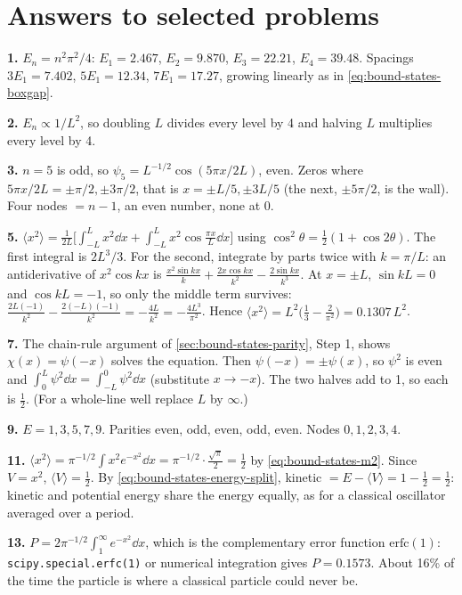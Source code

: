 \section{Answers to selected problems}\label{sec:bound-states-answers}

\textbf{1.} $E_n=n^2\pi^2/4$: $E_1=2.467$, $E_2=9.870$, $E_3=22.21$, $E_4=39.48$. Spacings $3E_1=7.402$, $5E_1=12.34$, $7E_1=17.27$, growing linearly as in \cref{eq:bound-states-boxgap}.

\textbf{2.} $E_n\propto1/L^2$, so doubling $L$ divides every level by 4 and halving $L$ multiplies every level by 4.

\textbf{3.} $n=5$ is odd, so $\psi_5=L^{-1/2}\cos(5\pi x/2L)$, even. Zeros where $5\pi x/2L=\pm\pi/2,\pm3\pi/2$, that is $x=\pm L/5,\pm3L/5$ (the next, $\pm5\pi/2$, is the wall). Four nodes $=n-1$, an even number, none at $0$.

\textbf{5.} $\langle x^2\rangle=\frac{1}{2L}\bigl[\int_{-L}^{L}x^2\dd x+\int_{-L}^{L}x^2\cos\frac{\pi x}{L}\dd x\bigr]$ using $\cos^2\theta=\tfrac12(1+\cos2\theta)$. The first integral is $2L^3/3$. For the second, integrate by parts twice with $k=\pi/L$: an antiderivative of $x^2\cos kx$ is $\frac{x^2\sin kx}{k}+\frac{2x\cos kx}{k^2}-\frac{2\sin kx}{k^3}$. At $x=\pm L$, $\sin kL=0$ and $\cos kL=-1$, so only the middle term survives: $\frac{2L(-1)}{k^2}-\frac{2(-L)(-1)}{k^2}=-\frac{4L}{k^2}=-\frac{4L^3}{\pi^2}$. Hence $\langle x^2\rangle=L^2\bigl(\frac13-\frac{2}{\pi^2}\bigr)=0.1307\,L^2$.

\textbf{7.} The chain-rule argument of \cref{sec:bound-states-parity}, Step 1, shows $\chi(x)=\psi(-x)$ solves the equation. Then $\psi(-x)=\pm\psi(x)$, so $\psi^2$ is even and $\int_0^{L}\psi^2\dd x=\int_{-L}^{0}\psi^2\dd x$ (substitute $x\to-x$). The two halves add to 1, so each is $\tfrac12$. (For a whole-line well replace $L$ by $\infty$.)

\textbf{9.} $E=1,3,5,7,9$. Parities even, odd, even, odd, even. Nodes $0,1,2,3,4$.

\textbf{11.} $\langle x^2\rangle=\pi^{-1/2}\int x^2e^{-x^2}\dd x=\pi^{-1/2}\cdot\frac{\sqrt\pi}{2}=\frac12$ by \cref{eq:bound-states-m2}. Since $V=x^2$, $\langle V\rangle=\frac12$. By \cref{eq:bound-states-energy-split}, kinetic $=E-\langle V\rangle=1-\frac12=\frac12$: kinetic and potential energy share the energy equally, as for a classical oscillator averaged over a period.

\textbf{13.} $P=2\pi^{-1/2}\int_1^\infty e^{-x^2}\dd x$, which is the complementary error function $\mathrm{erfc}(1)$: \texttt{scipy.special.erfc(1)} or numerical integration gives $P=0.1573$. About 16\% of the time the particle is where a classical particle could never be.

